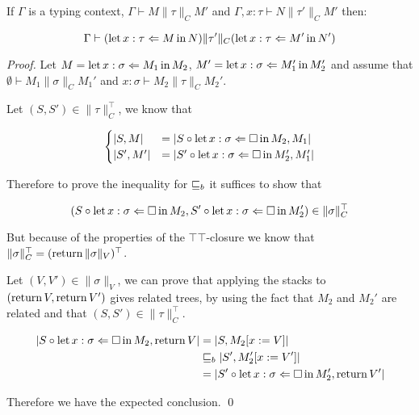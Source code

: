 \begin{alemma}
    If $\Gamma$ is a typing context,
    $\Gamma \vdash M \| \tau \|_C M'$ and 
    $\Gamma, x : \tau \vdash N \| \tau' \|_C M'$
    then:

    \begin{equation*}
        \Gamma \vdash (\Bind{M}{x:\tau}{N}) \| \tau' \|_C 
        (\Bind{M'}{x:\tau}{N'})
    \end{equation*}
\end{alemma}
\begin{proof}
Let $M = \Bind{M_1}{x:\sigma}{M_2}$,
$M' = \Bind{M_1'}{x:\sigma}{M_2'}$ and assume 
that $\emptyset \vdash M_1 \| \sigma \|_C M_1'$
and $x : \sigma \vdash M_2 \| \tau \|_C M_2'$.

Let $(S,S') \in \| \tau \|_C^\top$, we know that

\begin{equation*}
    \begin{cases}
        | S, M | &=
        | S \circ \Bind{\square}{x : \sigma}{M_2}, M_1| \\
        | S', M' | &=
        | S' \circ \Bind{\square}{x : \sigma}{M_2'}, M_1'| \\
    \end{cases}
\end{equation*}

Therefore to prove the inequality for $\sqeq_b$ it suffices 
to show that

\begin{equation*}
    (S \circ \Bind{\square}{x : \sigma}{M_2},
     S' \circ \Bind{\square}{x : \sigma}{M_2'})
     \in \| \sigma \|_C^\top
\end{equation*}

But because of the properties of the 
$\top\top$-closure we know that 
$\| \sigma \|_C^\top = (\Ret \| \sigma \|_V)^\top$.

Let $(V,V') \in \| \sigma \|_V$, we can prove that 
applying the stacks to $(\Ret V, \Ret V')$ gives 
related trees, by using the fact that $M_2$ and $M_2'$
are related and that $(S,S') \in \| \tau \|_C^\top$.

\begin{align*}
    | S \circ \Bind{\square}{x : \sigma}{M_2}, \Ret V| 
    &= |S,  M_2[ x := V] | \\
    & \sqeq_b |S', M_2' [ x := V'] | \\
    &= 
    | S' \circ \Bind{\square}{x : \sigma}{M_2'}, \Ret V'| 
\end{align*}

Therefore we have the expected conclusion.
\qed\end{proof}

